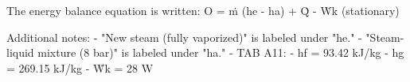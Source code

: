 The energy balance equation is written:  
O = ṁ (he - ha) + Q̇ - Ẇk  
(stationary)  

Additional notes:  
- "New steam (fully vaporized)" is labeled under "he."  
- "Steam-liquid mixture (8 bar)" is labeled under "ha."  
- TAB A11:  
  - hf = 93.42 kJ/kg  
  - hg = 269.15 kJ/kg  
- Ẇk = 28 W